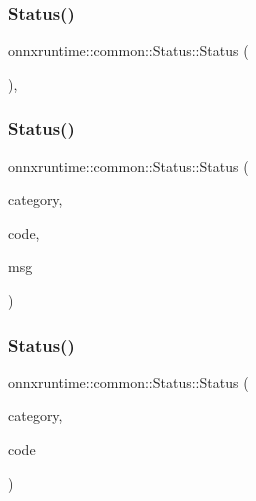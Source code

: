 \subsubsection{\texorpdfstring{Status()}{Status()}\hspace{0.1cm}{\footnotesize\ttfamily [1/5]}}
{\footnotesize\ttfamily onnxruntime\+::common\+::\+Status\+::\+Status (\begin{DoxyParamCaption}{ }\end{DoxyParamCaption})\hspace{0.3cm}{\ttfamily [default]}, {\ttfamily [noexcept]}}

\mbox{\label{classonnxruntime_1_1common_1_1Status_adc2c0cc84bd26eed82c8d480db39d94a}} 
\subsubsection{\texorpdfstring{Status()}{Status()}\hspace{0.1cm}{\footnotesize\ttfamily [2/5]}}
{\footnotesize\ttfamily onnxruntime\+::common\+::\+Status\+::\+Status (\begin{DoxyParamCaption}\item[{\mbox{\hyperlink{namespaceonnxruntime_1_1common_afab40a94a5b6b651a1c24921d4e5c4d5}{Status\+Category}}}]{category,  }\item[{int}]{code,  }\item[{const std\+::string \&}]{msg }\end{DoxyParamCaption})}

\mbox{\label{classonnxruntime_1_1common_1_1Status_ae8c45d61f46c762f7a5f02ea48680067}} 
\subsubsection{\texorpdfstring{Status()}{Status()}\hspace{0.1cm}{\footnotesize\ttfamily [3/5]}}
{\footnotesize\ttfamily onnxruntime\+::common\+::\+Status\+::\+Status (\begin{DoxyParamCaption}\item[{\mbox{\hyperlink{namespaceonnxruntime_1_1common_afab40a94a5b6b651a1c24921d4e5c4d5}{Status\+Category}}}]{category,  }\item[{int}]{code }\end{DoxyParamCaption})}

